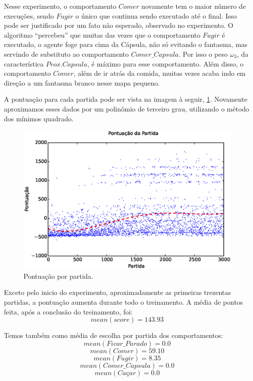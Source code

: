 Nesse experimento, o comportamento $ Comer $ novamente tem o maior número de execuções, sendo $ Fugir $ o único que continua sendo executado até o final. Isso pode ser justificado por um fato não esperado, observado no experimento. O algoritmo ``percebeu'' que muitas das vezes que o comportamento $ Fugir $ é executado, o agente foge para cima da Cápsula, não só evitando o fantasma, mas servindo de substituto ao comportamento $ Comer\_Capsula $. Por isso o peso $ \omega_3 $, da característica $ Prox. Capsula $, é máximo para esse comportamento. Além disso, o comportamento $ Comer $, além de ir atrás da comida, muitas vezes acaba indo em direção a um fantasma branco nesse mapa pequeno.

A pontuação para cada partida pode ser vista na imagem à seguir, \ref{img:5ComportamentosMapaPequeno:PontuacaoPorPartida}. Novamente aproximamos esses dados por um polinômio de terceiro grau, utilizando o método dos mínimos quadrado.

\begin{figure}[H]
    \centering
    \includegraphics[width=\linewidth]{images/5_behaviors_small_map/match_scores____pol}
    \caption{Pontuação por partida.}
    \label{img:5ComportamentosMapaPequeno:PontuacaoPorPartida}
\end{figure}

Exceto pelo inicio do experimento, aproximadamente as primeiras trezentas partidas, a pontuação aumenta durante todo o treinamento. A média de pontos feita, após a conclusão do treinamento, foi:
$$ mean \left( score \right) = 143.93 $$

Temos também como média de escolha por partida dos comportamentos:
$$ mean \left( Ficar\_Parado \right) = 0.0 $$
$$ mean \left( Comer \right) = 59.10 $$
$$ mean \left( Fugir \right) = 8.35 $$
$$ mean \left( Comer\_Capsula \right) = 0.0 $$
$$ mean \left( \textit{Caçar} \right) = 0.0 $$


